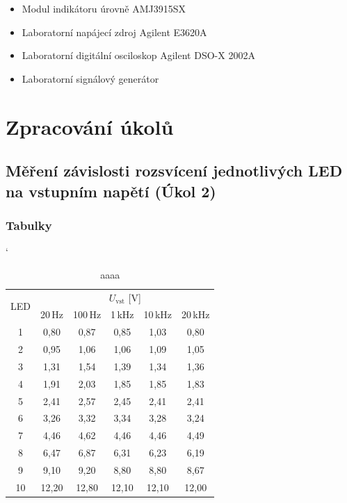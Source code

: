 \documentclass[a4paper, czech]{article}
\begin{document}
\begin{itemize}
    \item Modul indikátoru úrovně AMJ3915SX
    \item Laboratorní napájecí zdroj Agilent E3620A
    \item Laboratorní digitální osciloskop Agilent DSO-X 2002A
    \item Laboratorní signálový generátor
\end{itemize}

\section{Zpracování úkolů}

\subsection{Měření závislosti rozsvícení jednotlivých LED na vstupním napětí (Úkol 2)}

\subsubsection{Tabulky}

\begin{table}[H]
    \catcode`
    \centering
    \caption{aaaa}
    \begin{tabular}{cccccc}
        \toprule
        \multirow{2}{*}{LED} & \multicolumn{5}{c}{$U_{\text{vst}}$ [V]} \\
        \cmidrule(rl){2-6}
            & 20\,Hz    & 100\,Hz   & 1\,kHz  & 10\,kHz & 20\,kHz \\
        \midrule
        1   & 0,80  & 0,87  & 0,85  & 1,03  & 0,80  \\
        2   & 0,95  & 1,06  & 1,06  & 1,09  & 1,05  \\
        3   & 1,31  & 1,54  & 1,39  & 1,34  & 1,36  \\
        4   & 1,91  & 2,03  & 1,85  & 1,85  & 1,83  \\
        5   & 2,41  & 2,57  & 2,45  & 2,41  & 2,41  \\
        6   & 3,26  & 3,32  & 3,34  & 3,28  & 3,24  \\
        7   & 4,46  & 4,62  & 4,46  & 4,46  & 4,49  \\
        8   & 6,47  & 6,87  & 6,31  & 6,23  & 6,19  \\
        9   & 9,10  & 9,20  & 8,80  & 8,80  & 8,67  \\
        10  & 12,20 & 12,80 & 12,10 & 12,10 & 12,00 \\
        \bottomrule
    \end{tabular}
\end{table}
\end{document}
